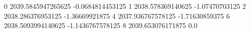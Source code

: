 0 2039.5845947265625 -0.0684814453125
1 2038.578369140625 -1.07470703125
2 2038.286376953125 -1.36669921875
4 2037.936767578125 -1.71630859375
6 2038.5093994140625 -1.1436767578125
8 2039.653076171875 0.0
